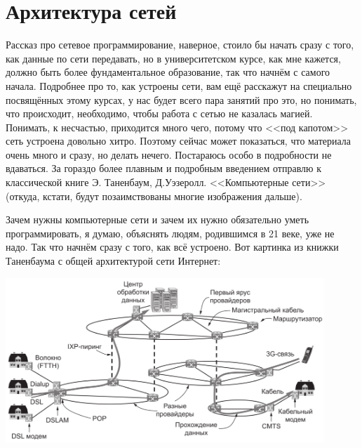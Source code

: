 \documentclass{../../text-style}
\begin{document}
\maketitle
\thispagestyle{empty}

\section{Архитектура сетей}

Рассказ про сетевое программирование, наверное, стоило бы начать сразу с того, как данные по сети передавать, но в университетском курсе, как мне кажется, должно быть более фундаментальное образование, так что начнём с самого начала. Подробнее про то, как устроены сети, вам ещё расскажут на специально посвящённых этому курсах, у нас будет всего пара занятий про это, но понимать, что происходит, необходимо, чтобы работа с сетью не казалась магией. Понимать, к несчастью, приходится много чего, потому что <<под капотом>> сеть устроена довольно хитро. Поэтому сейчас может показаться, что материала очень много и сразу, но делать нечего. Постараюсь особо в подробности не вдаваться. За гораздо более плавным и подробным введением отправлю к классической книге Э. Таненбаум, Д.Уэзеролл. <<Компьютерные сети>> (откуда, кстати, будут позаимствованы многие изображения дальше).

Зачем нужны компьютерные сети и зачем их нужно обязательно уметь программировать, я думаю, объяснять людям, родившимся в 21 веке, уже не надо. Так что начнём сразу с того, как всё устроено. Вот картинка из книжки Таненбаума с общей архитектурой сети Интернет:
\begin{center}
    \includegraphics[width=0.9\textwidth]{internetArchitecture.png}
\end{center}
\end{document}
